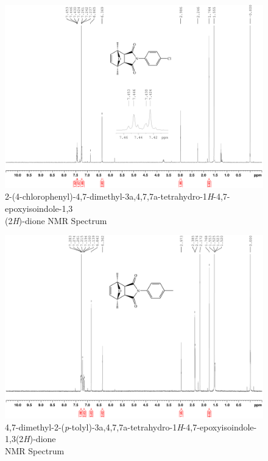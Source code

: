 \documentclass[11pt]{article}
\begin{document}
\begin{figure}[H]
    \centering
    \includegraphics[scale=0.105]{spectra/nmr9.3.png}
    \caption{2-(4-chlorophenyl)-4,7-dimethyl-3a,4,7,7a-tetrahydro-1\textit{H}-4,7-epoxyisoindole-1,3\\(2\textit{H})-dione NMR Spectrum}
\end{figure}
\begin{figure}[H]
    \centering
    \includegraphics[scale=0.105]{spectra/nmr10.3.png}
    \caption{4,7-dimethyl-2-(\textit{p}-tolyl)-3a,4,7,7a-tetrahydro-1\textit{H}-4,7-epoxyisoindole-1,3(2\textit{H})-dione \\NMR Spectrum}
\end{figure}

\newpage
\end{document}
